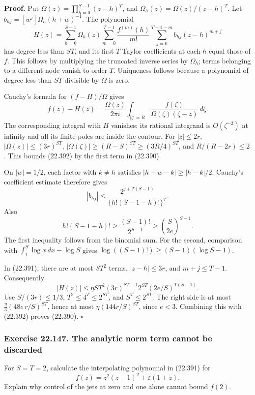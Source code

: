 \documentclass[
  11pt,
  a4paper,
]{article}
\begin{document}
\textbf{Proof.} Put \(\Omega(z)=\prod_{h=0}^{S-1}(z-h)^T\), and
\(\Omega_h(z)=\Omega(z)/(z-h)^T\). Let
\(b_{hj}=[w^j]\Omega_h(h+w)^{-1}\). The polynomial \[
 H(z)=\sum_{h=0}^{S-1}\Omega_h(z)
       \sum_{m=0}^{T-1}\frac{f^{(m)}(h)}{m!}
       \sum_{j=0}^{T-1-m}b_{hj}(z-h)^{m+j}
 \tag{22.391}
\] has degree less than \(ST\), and its first \(T\) Taylor coefficients
at each \(h\) equal those of \(f\). This follows by multiplying the
truncated inverse series by \(\Omega_h\); terms belonging to a different
node vanish to order \(T\). Uniqueness follows because a polynomial of
degree less than \(ST\) divisible by \(\Omega\) is zero.

Cauchy's formula for \((f-H)/\Omega\) gives \[
 f(z)-H(z)=\frac{\Omega(z)}{2\pi i}
       \int_{|\zeta|=R}
       \frac{f(\zeta)}{\Omega(\zeta)(\zeta-z)}\,d\zeta.
 \tag{22.392}
\] The corresponding integral with \(H\) vanishes: its rational
integrand is \(O(\zeta^{-2})\) at infinity and all its finite poles are
inside the contour. For \(|z|\le2r\), \(|\Omega(z)|\le(3r)^{ST}\),
\(|\Omega(\zeta)|\ge(R-S)^{ST}\ge(3R/4)^{ST}\), and \(R/(R-2r)\le2\).
This bounds (22.392) by the first term in (22.390).

On \(|w|=1/2\), each factor with \(k\ne h\) satisfies
\(|h+w-k|\ge|h-k|/2\). Cauchy's coefficient estimate therefore gives \[
 |b_{hj}|\le
       \frac{2^{j+T(S-1)}}{\{h!(S-1-h)!\}^{T}}.
 \tag{22.393}
\] Also \[
 h!(S-1-h)!\ge\frac{(S-1)!}{2^{S-1}}
                  \ge\left(\frac{S}{2e}\right)^{S-1}.
 \tag{22.394}
\] The first inequality follows from the binomial sum. For the second,
comparison with \(\int_1^S\log x\,dx-\log S\) gives
\(\log((S-1)!)\ge(S-1)(\log S-1)\).

In (22.391), there are at most \(ST^2\) terms, \(|z-h|\le3r\), and
\(m+j\le T-1\). Consequently \[
 |H(z)|\le
 \eta ST^2(3r)^{ST-1}2^{ST}
                    (2e/S)^{T(S-1)}.
 \tag{22.395}
\] Use \(S/(3r)\le1/3\), \(T^2\le4^T\le2^{ST}\), and \(S^T\le2^{ST}\).
The right side is at most \(\frac{\eta}{3}(48e\,r/S)^{ST}\), hence at
most \(\eta(144r/S)^{ST}\), since \(e<3\). Combining this with (22.392)
proves (22.390). \(\square\)

\subsubsection{Exercise 22.147. The analytic norm term cannot be
discarded}\label{exercise-22.147.-the-analytic-norm-term-cannot-be-discarded}

For \(S=T=2\), calculate the interpolating polynomial in (22.391) for \[
 f(z)=z^2(z-1)^2+\varepsilon(1+z).
 \tag{22.396}
\] Explain why control of the jets at zero and one alone cannot bound
\(f(2)\).
\end{document}
